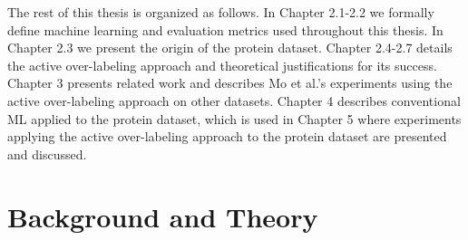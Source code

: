 \documentclass[ms]{nuthesis}
\begin{document}
\par The rest of this thesis is organized as follows. In Chapter 2.1-2.2 we formally define machine learning
and evaluation metrics used throughout this thesis. In Chapter 2.3 we present the origin of the protein dataset.
 Chapter 2.4-2.7 details the active over-labeling approach and theoretical justifications for its success.
 Chapter 3 presents related work and describes Mo et al.'s experiments using the active over-labeling approach on
  other datasets. Chapter 4 describes conventional ML applied to the protein dataset, which is used in Chapter 5 where
  experiments applying the active over-labeling approach to the protein dataset are presented and discussed.



\chapter{Background and Theory}
\end{document}

